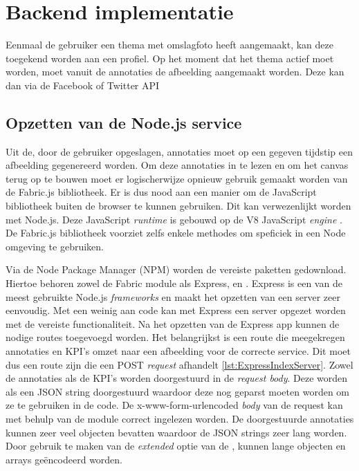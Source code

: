 

\section{Backend implementatie}\label{BackendImplementatie}

Eenmaal de gebruiker een thema met omslagfoto heeft aangemaakt, kan deze toegekend worden aan een profiel. Op het moment dat het thema actief moet worden, moet vanuit de annotaties de afbeelding aangemaakt worden. Deze kan dan via de Facebook of Twitter API

\subsection{Opzetten van de Node.js service}
Uit de, door de gebruiker opgeslagen, annotaties moet op een gegeven tijdstip een afbeelding gegenereerd worden. Om deze annotaties in te lezen en om het canvas terug op te bouwen moet er logischerwijze opnieuw gebruik gemaakt worden van de Fabric.js bibliotheek. Er is dus nood aan een manier om de JavaScript bibliotheek buiten de browser te kunnen gebruiken. Dit kan verwezenlijkt worden met Node.js. Deze JavaScript \textit{runtime} is gebouwd op de V8 JavaScript \textit{engine} \cite{NodeJS}. De Fabric.js bibliotheek voorziet zelfs enkele methodes om speficiek in een Node omgeving te gebruiken.

Via de Node Package Manager (NPM) worden de vereiste paketten gedownload. Hiertoe behoren zowel de Fabric module als Express,  en . Express is een van de meest gebruikte Node.js \textit{frameworks} en maakt het opzetten van een server zeer eenvoudig. Met een weinig aan code kan met Express een server opgezet worden met de vereiste functionaliteit. Na het opzetten van de Express app kunnen de nodige routes toegevoegd worden. Het belangrijkst is een route die meegekregen annotaties en KPI's omzet naar een afbeelding voor de correcte service. Dit moet dus een route zijn die een POST \textit{request} afhandelt \ref{lst:ExpressIndexServer}. Zowel de annotaties als de KPI's worden doorgestuurd in de \textit{request body}. Deze worden als een JSON string doorgestuurd waardoor deze nog geparst moeten worden om ze te gebruiken in de code. De x-www-form-urlencoded \textit{body} van de request kan met behulp van de  module correct ingelezen worden. De doorgestuurde annotaties kunnen zeer veel objecten bevatten waardoor de JSON strings zeer lang worden. Door gebruik te maken van de \textit{extended} optie van de , kunnen lange objecten en arrays ge\"{e}ncodeerd worden. 

